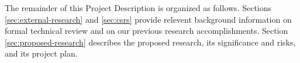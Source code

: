The remainder of this Project Description is organized as follows.
Sections \ref{sec:external-research} and \ref{sec:csrs} provide relevent
background information on formal technical review and on our previous
research accomplishments.  Section \ref{sec:proposed-research} describes
the proposed research, its significance and risks, and its project plan.






 


